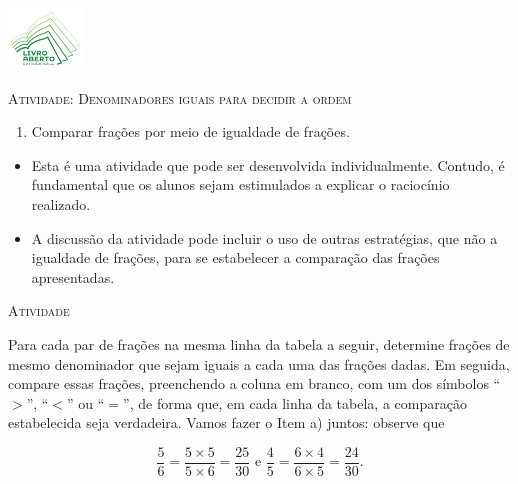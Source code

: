 \documentclass[10 pt,usenames,dvipsnames, oneside]{article}
\begin{document}
\begin{center}
  \begin{minipage}[l]{3cm}
\includegraphics[width=2cm]{../../../Figuras/logo}       
\end{minipage}\hfill
\begin{minipage}[r]{.8\textwidth}
 {\Large \scshape Atividade: Denominadores iguais para decidir a ordem}  
\end{minipage}
\end{center}
\vspace{.2cm}

\ifdefined\prof
\begin{goals}
\begin{enumerate}
\item       Comparar frações por meio de igualdade de frações.
\end{enumerate}

\tcblower

\begin{itemize}
    \item       Esta é uma atividade que pode ser desenvolvida individualmente.
Contudo, é fundamental que os alunos sejam estimulados a explicar o raciocínio
realizado.
    \item       A discussão da atividade pode incluir o uso de outras
estratégias, que não a igualdade de frações, para se estabelecer a comparação
das frações apresentadas.
\end{itemize}
\end{goals}

\bigskip
\begin{center}
{\large \scshape Atividade}
\end{center}
\fi

Para cada par de frações na mesma linha da tabela a seguir, determine frações de mesmo denominador que sejam iguais a cada uma das frações dadas. Em seguida, compare essas frações, preenchendo a coluna em branco, com um dos símbolos ``$>$'', ``$<$'' ou ``$=$'', de forma que, em cada linha da tabela, a comparação estabelecida seja verdadeira. Vamos fazer o Item a) juntos: observe que

$$\dfrac{5}{6} = \dfrac{5 \times 5}{5 \times 6} = \dfrac{25}{30} \text{ e } \dfrac{4}{5} = \dfrac{6 \times 4}{6 \times 5} = \dfrac{24}{30}.$$
\end{document}
